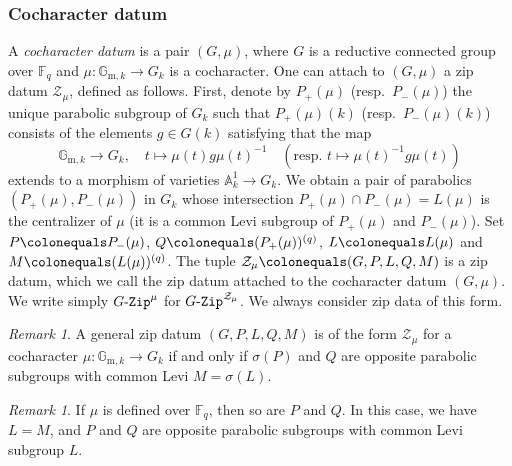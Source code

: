 \documentclass[11pt]{amsart}
\numberwithin{equation}{section}
\theoremstyle{definition}
\theoremstyle{remark}
\newtheorem{rmk}[theorem]{Remark}
\newcommand{\GZip}{\mathop{\text{$G$-{\tt Zip}}}\nolimits}
\newcommand{\Zcal}{{\mathcal Z}}
\renewcommand{\AA}{\mathbb{A}}
\newcommand{\FF}{\mathbb{F}}
\newcommand{\GG}{\mathbb{G}}
\newcommand{\lra}{\longrightarrow}
\begin{document}
\subsubsection{Cocharacter datum} \label{subsec-cochar}
A \emph{cocharacter datum} is a pair $(G,\mu)$, where $G$ is a reductive connected group over $\FF_q$ and $\mu \colon \GG_{\mathrm{m},k}\to G_k$ is a cocharacter. One can attach to $(G,\mu)$ a zip datum $\Zcal_\mu$, defined as follows. First, denote by $P_+(\mu)$ (resp.\ $P_-(\mu)$) the unique parabolic subgroup of $G_k$ such that $P_+(\mu)(k)$ (resp.\ $P_-(\mu)(k)$) consists of the elements $g\in G(k)$ satisfying that the map 
\[
\GG_{\mathrm{m},k} \lra G_{k},\quad  t\longmapsto\mu(t)g\mu(t)^{-1} \quad \left(\textrm{resp.\ } t\longmapsto\mu(t)^{-1}g\mu(t)\right)
\]
extends to a morphism of varieties $\AA_{k}^1\to G_{k}$. We obtain a pair of parabolics $(P_+(\mu),P_{-}(\mu))$ in $G_k$ whose intersection $P_+(\mu)\cap P_-(\mu)=L(\mu)$ is the centralizer of $\mu$ (it is a common Levi subgroup of $P_+(\mu)$ and $P_-(\mu)$). Set $P \colonequals P_-(\mu)$, $Q \colonequals (P_+(\mu))^{(q)}$, $L \colonequals L(\mu)$ and $M \colonequals  (L(\mu))^{(q)}$. The tuple $\Zcal_\mu \colonequals (G,P,L,Q,M)$ is a zip datum, which we call the zip datum attached to the cocharacter datum $(G,\mu)$. We write simply $\GZip^\mu$ for $\GZip^{\Zcal_\mu}$. We always consider zip data of this form.

\begin{rmk}\label{rmk-opposite-cochar}
A general zip datum $(G,P,L,Q,M)$ is of the form $\Zcal_\mu$ for a cocharacter $\mu \colon \GG_{\mathrm{m},k}\to G_k$ if and only if $\sigma(P)$ and $Q$ are opposite parabolic subgroups with common Levi $M=\sigma(L)$.
\end{rmk}

\begin{rmk}\label{rmkmuFp}
If $\mu$ is defined over $\FF_q$, then so are $P$ and $Q$. In this case, we have $L=M$, and $P$ and $Q$ are opposite parabolic subgroups with common Levi subgroup $L$.
\end{rmk}
\end{document}

